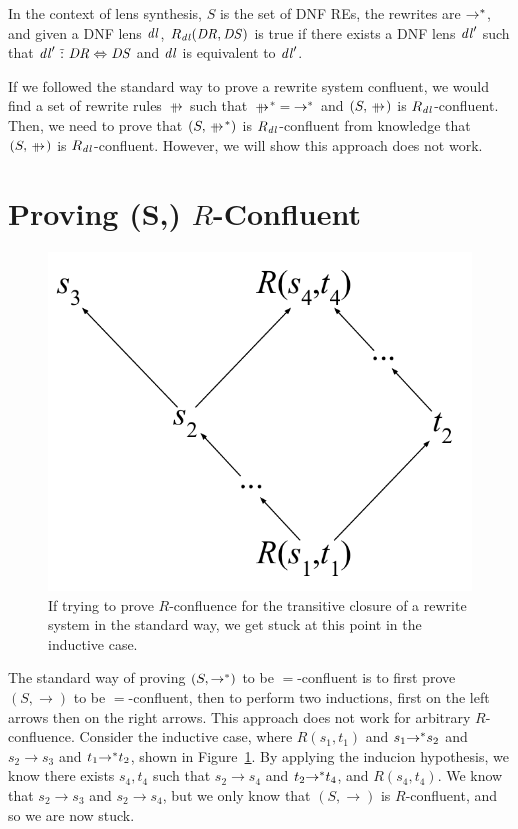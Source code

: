 \documentclass{easychair}
\begin{document}
In the context of lens synthesis, $S$ is the set of DNF REs,
the rewrites are ${\rightarrow}^*$, and given a DNF lens $\mathit{dl}$,
$R_{\mathit{dl}}(\mathit{DR},\mathit{DS})$ is true if there exists a DNF lens $\mathit{dl}'$ such
that $\mathit{dl}' \,\,\tilde{:}\,\, \mathit{DR} \Leftrightarrow \mathit{DS}$ and
$\mathit{dl}$ is equivalent to $\mathit{dl}'$.

If we followed the standard way to prove a rewrite system confluent, we would
find a set of rewrite rules $\ParallelRewrite$ such that
$\StarOf{\ParallelRewrite} = \StarOf{\Rewrite}$ and $(S,\ParallelRewrite)$ is
$R_{\mathit{dl}}$-confluent. Then, we need to prove that
$(S,\StarOf{\ParallelRewrite})$ is $R_{\mathit{dl}}$-confluent from knowledge that
$(S,\ParallelRewrite)$ is $R_{\mathit{dl}}$-confluent. However, we will show this
approach does not work.

\section{Proving (S,\StarOf{\rightarrow}) $R$-Confluent}

\begin{figure}
  \centering
    \includegraphics[scale=.4]{proof-attempt.pdf}
    \caption{If trying to prove $R$-confluence for the transitive closure of a
      rewrite system in the standard way, we get stuck at this point in the
      inductive case.}
    \label{fig:proof-attempt}
\end{figure}

The standard way of proving $(S,{\rightarrow}^*)$ to be $=$-confluent is to
first prove $(S,\rightarrow)$ to be $=$-confluent, then to perform two
inductions, first on the left arrows then on the right arrows. This approach
does not work for arbitrary $R$-confluence. Consider the inductive case, where
$R(s_1,t_1)$ and $s_1 {\rightarrow}^* s_2$ and $s_2 \rightarrow s_3$ and
$t_1 {\rightarrow}^* t_2$, shown in Figure~\ref{fig:proof-attempt}. By
applying the inducion hypothesis, we know there exists $s_4, t_4$ such that $s_2
\rightarrow s_4$ and $t_2 {\rightarrow}^* t_4$, and $R(s_4,t_4)$. We know
that $s_2 \rightarrow s_3$ and $s_2 \rightarrow s_4$, but we only know that
$(S,\rightarrow)$ is $R$-confluent, and so we are now stuck.
\end{document}
